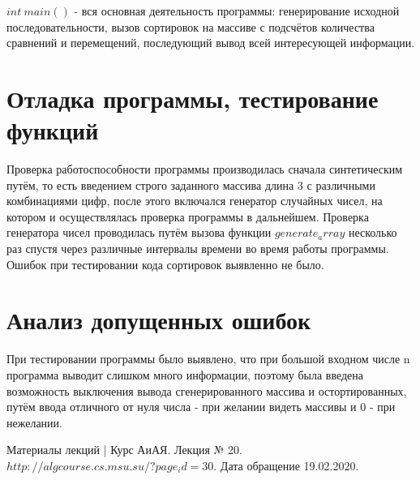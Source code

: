 \documentclass[a4paper,12pt,titlepage,finall]{article}
\begin{document}
$int ~ main()$ - вся основная деятельность программы: генерирование исходной последовательности, вызов сортировок на массиве с подсчётов количества сравнений и перемещений, последующий вывод всей интересующей информации.

\newpage

\section{Отладка программы, тестирование функций}

Проверка работоспособности программы производилась сначала синтетическим путём, то есть введением строго заданного массива длина 3 с различными комбинациями цифр, после этого включался генератор случайных чисел, на котором и осуществлялась проверка программы в дальнейшем. Проверка генератора чисел проводилась путём вызова функции $generate _array$ несколько раз спустя через различные интервалы времени во время работы программы. Ошибок при тестировании кода сортировок выявленно не было.

\newpage

\section{Анализ допущенных ошибок}

При тестировании программы было выявлено, что при большой входном числе n программа выводит слишком много информации, поэтому была введена возможность выключения вывода сгенерированного массива и остортированных, путём ввода отличного от нуля числа - при желании видеть массивы и 0 - при нежелании.

\newpage
\begin{raggedright}
\begin{thebibliography}{99}
 Материалы лекций | Курс АиАЯ. Лекция № 20. $http://algcourse.cs.msu.su/?page_id=30$. Дата обращение 19.02.2020. 
\end{thebibliography}
\end{raggedright}
\end{document}
